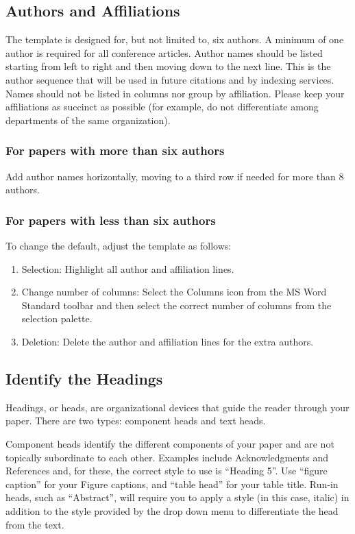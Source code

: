 \documentclass[a4paper,conference]{IEEEtran}
\begin{document}
\subsection{Authors and Affiliations}
The template is designed for, but not limited to, six authors. A minimum of one author is required for all conference articles. Author names should be listed starting from left to right and then moving down to the next line. This is the author sequence that will be used in future citations and by indexing services. Names should not be listed in columns nor group by affiliation. Please keep your affiliations as succinct as possible (for example, do not differentiate among departments of the same organization).

\subsubsection{For papers with more than six authors}
Add author names horizontally, moving to a third row if needed for more than 8 authors.

\subsubsection{For papers with less than six authors}
To change the default, adjust the template as follows:
\begin{enumerate}
    \item Selection: Highlight all author and affiliation lines.
    \item Change number of columns: Select the Columns icon from the MS Word Standard toolbar and then select the correct number of columns from the selection palette.
    \item Deletion: Delete the author and affiliation lines for the extra authors.
\end{enumerate}

\subsection{Identify the Headings}
Headings, or heads, are organizational devices that guide the reader through your paper. There are two types: component heads and text heads.

Component heads identify the different components of your paper and are not topically subordinate to each other. Examples include Acknowledgments and References and, for these, the correct style to use is “Heading 5”. Use “figure caption” for your Figure captions, and “table head” for your table title. Run-in heads, such as “Abstract”, will require you to apply a style (in this case, italic) in addition to the style provided by the drop down menu to differentiate the head from the text.
\end{document}
